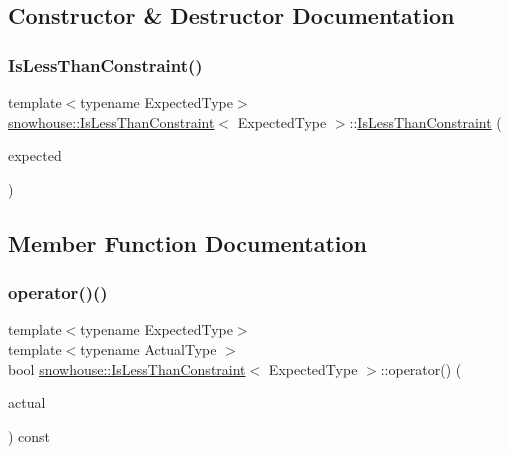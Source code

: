 \subsection{Constructor \& Destructor Documentation}
\mbox{\label{structsnowhouse_1_1IsLessThanConstraint_ac84e0ef9f32ccfc57f29e3d99ad1df20}} 
\subsubsection{\texorpdfstring{IsLessThanConstraint()}{IsLessThanConstraint()}}
{\footnotesize\ttfamily template$<$typename Expected\+Type$>$ \\
\mbox{\hyperlink{structsnowhouse_1_1IsLessThanConstraint}{snowhouse\+::\+Is\+Less\+Than\+Constraint}}$<$ Expected\+Type $>$\+::\mbox{\hyperlink{structsnowhouse_1_1IsLessThanConstraint}{Is\+Less\+Than\+Constraint}} (\begin{DoxyParamCaption}\item[{const Expected\+Type \&}]{expected }\end{DoxyParamCaption})\hspace{0.3cm}{\ttfamily [inline]}}



\subsection{Member Function Documentation}
\mbox{\label{structsnowhouse_1_1IsLessThanConstraint_a7de3d3ec1601c58e8f153acce340b192}} 
\subsubsection{\texorpdfstring{operator()()}{operator()()}}
{\footnotesize\ttfamily template$<$typename Expected\+Type$>$ \\
template$<$typename Actual\+Type $>$ \\
bool \mbox{\hyperlink{structsnowhouse_1_1IsLessThanConstraint}{snowhouse\+::\+Is\+Less\+Than\+Constraint}}$<$ Expected\+Type $>$\+::operator() (\begin{DoxyParamCaption}\item[{const Actual\+Type \&}]{actual }\end{DoxyParamCaption}) const\hspace{0.3cm}{\ttfamily [inline]}}



